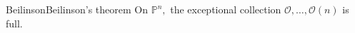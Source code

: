 \begin{theorem}{Beilinson}{Beilinson's theorem}
    On $\mathbb{P}^n,$ the exceptional collection $\mathcal{O},\dots,\mathcal{O}(n)$ is full.
\end{theorem} 





